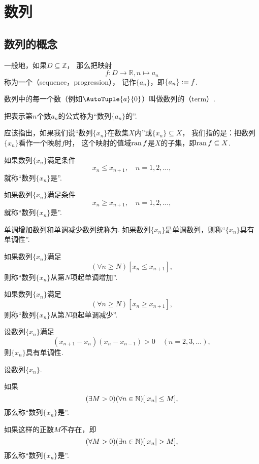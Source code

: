 \chapter{数列}
\section{数列的概念}
\begin{definition}\label{definition:数列.数列的定义}
一般地，如果\(D \subseteq \mathbb{Z}\)，
那么把映射\[
    f\colon D\to\mathbb{R}, n \mapsto a_n
\]称为一个（sequence，progression），
记作\(\{a_n\}\)，即\(\{a_n\} := f\).

数列中的每一个数（例如\(\AutoTuple{a}{0}\)）叫做数列的（term）.

把表示第\(n\)个数\(a_n\)的公式称为“数列\(\{a_n\}\)的”.
\end{definition}

应该指出，如果我们说“数列\(\{x_n\}\)在数集\(X\)内”或\(\{x_n\} \subseteq X\)，
我们指的是：把数列\(\{x_n\}\)看作一个映射\(f\)时，
这个映射的值域\(\operatorname{ran} f\)是\(X\)的子集，即\(\operatorname{ran} f \subseteq X\).

\begin{definition}
如果数列\(\{x_n\}\)满足条件\[
	x_n \leq x_{n+1}, \quad n=1,2,\dotsc,
\]
就称“数列\(\{x_n\}\)是”.

如果数列\(\{x_n\}\)满足条件\[
	x_n \geq x_{n+1}, \quad n=1,2,\dotsc,
\]
就称“数列\(\{x_n\}\)是”.

单调增加数列和单调减少数列统称为.
如果数列\(\{x_n\}\)是单调数列，则称“\(\{x_n\}\)具有单调性”.
\end{definition}

\begin{definition}
如果数列\(\{x_n\}\)满足\[
	(\forall n \geq N)[x_n \leq x_{n+1}],
\]
则称“数列\(\{x_n\}\)从第\(N\)项起单调增加”.

如果数列\(\{x_n\}\)满足\[
	(\forall n \geq N)[x_n \geq x_{n+1}],
\]
则称“数列\(\{x_n\}\)从第\(N\)项起单调减少”.
\end{definition}

\begin{proposition}
设数列\(\{x_n\}\)满足\[
	(x_{n+1}-x_n)(x_n-x_{n-1})>0
	\quad(n=2,3,\dotsc),
\]
则\(\{x_n\}\)具有单调性.
\end{proposition}

\begin{definition}[数列的有界性]
设数列\(\{x_n\}\).

如果\[
	(\exists M>0)
	(\forall n\in\mathbb{N})
	[\abs{x_n} \leq M],
\]
那么称“数列\(\{x_n\}\)是”.

如果这样的正数\(M\)不存在，即\[
	(\forall M>0)
	(\exists n\in\mathbb{N})
	[\abs{x_n} > M],
\]
那么称“数列\(\{x_n\}\)是”.
\end{definition}

